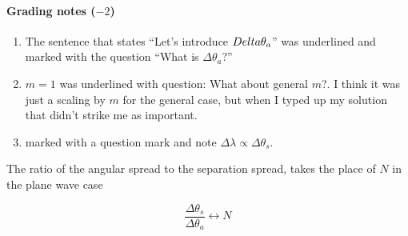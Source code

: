 {\paragraph{Grading notes ($-2$)}
\begin{enumerate}
\item The sentence that states ``Let's introduce $\\Delta \theta_a$'' was underlined and marked with the question ``What is $\Delta \theta_a$?''
\item $m = 1$ was underlined with question: What about general $m$?.  I think it was just a scaling by $m$ for the general case, but when I typed up my solution that didn't strike me as important.
\item {} marked with a question mark and note $\Delta \lambda \propto \Delta \theta_s$.
\end{enumerate}

The ratio of the angular spread to the separation spread, takes the place of $N$ in the plane wave case

\begin{dmath}\label{eqn:modernOptics:problemSet3:3:980}
\frac{\Delta \theta_s }{\Delta \theta_a} \leftrightarrow N
\end{dmath}


%
%

}
